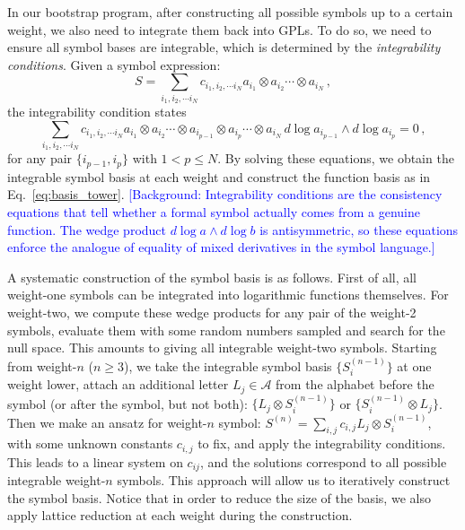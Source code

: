 \documentclass[a4paper,11pt]{article}
\begin{document}
In our bootstrap program, after constructing all possible symbols up to a certain weight, we also need to integrate them back into GPLs. To do so, we need to ensure all symbol bases are integrable, which is determined by the {\it integrability conditions}. Given a symbol expression:
\begin{equation}
    S=\sum_{i_1,i_2,\cdots i_N}c_{i_1,i_2,\cdots i_N} a_{i_1}\otimes a_{i_2}\cdots \otimes a_{i_N}\,,
\end{equation}
the integrability condition states
\begin{equation}
    \sum_{i_1,i_2,\cdots i_N}c_{i_1,i_2,\cdots i_N} a_{i_1}\otimes a_{i_2}\cdots \otimes a_{i_{p-1}}\otimes a_{i_{p}}\cdots \otimes a_{i_N} \, d\log a_{i_{p-1}} \wedge d\log a_{i_p} =0\,,
\end{equation}
for any pair $\{i_{p-1},i_p\}$ with $1<p\leq N$. By solving these equations, we obtain the integrable symbol basis at each weight and construct the function basis as in Eq.~\eqref{eq:basis_tower}. 
\textcolor{blue}{\small [Background: Integrability conditions are the consistency equations that tell whether a formal symbol actually comes from a genuine function. The wedge product $d\log a \wedge d\log b$ is antisymmetric, so these equations enforce the analogue of equality of mixed derivatives in the symbol language.]}


A systematic construction of the symbol basis is as follows. First of all, all weight-one symbols can be integrated into logarithmic functions themselves. For weight-two, we compute these wedge products for any pair of the weight-2 symbols, evaluate them with some random numbers sampled and search for the null space. This amounts to giving all integrable weight-two symbols. Starting from weight-$n$ ($n\geq 3$), we take the integrable symbol basis $\{S^{(n-1)}_i\}$ at one weight lower, attach an additional letter $L_j\in \mathcal{A}$ from the alphabet before the symbol (or after the symbol, but not both): $\{L_j\otimes S^{(n-1)}_i\}$ or $\{S^{(n-1)}_i\otimes L_j\}$. Then we make an ansatz for weight-$n$ symbol: $S^{(n)}=\sum_{i,j}c_{i,j}L_j\otimes S^{(n-1)}_i$, with some unknown constants $c_{i,j}$ to fix, and apply the integrability conditions. This leads to a linear system on $c_{ij}$, and the solutions correspond to all possible integrable weight-$n$ symbols. This approach will allow us to iteratively construct the symbol basis. Notice that in order to reduce the size of the basis, we also apply lattice reduction at each weight during the construction. 
\end{document}
